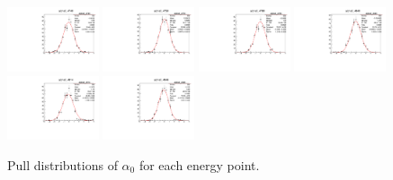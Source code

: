 \begin{figure}[h]
    \includegraphics[width=0.24\textwidth]{figure/io/polarization/pull_polarization_alpha0_4740.pdf}
    \includegraphics[width=0.24\textwidth]{figure/io/polarization/pull_polarization_alpha0_4750.pdf}
    \includegraphics[width=0.24\textwidth]{figure/io/polarization/pull_polarization_alpha0_4780.pdf}
    \includegraphics[width=0.24\textwidth]{figure/io/polarization/pull_polarization_alpha0_4840.pdf}
    \includegraphics[width=0.24\textwidth]{figure/io/polarization/pull_polarization_alpha0_4914.pdf}
    \includegraphics[width=0.24\textwidth]{figure/io/polarization/pull_polarization_alpha0_4946.pdf}
    \caption{Pull distributions of $\alpha_0$ for each energy point.}
\label{fig:io_pull_alpha0}
\end{figure}

